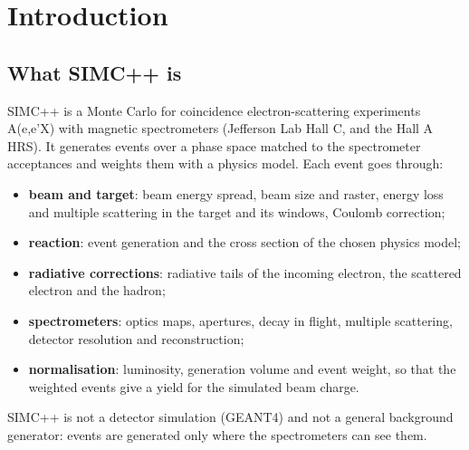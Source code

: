 \chapter{\texorpdfstring{Introduction}{Introduction}}\label{user_manual-01u5fintroduction}
\section{\texorpdfstring{What SIMC++ is}{What SIMC++ is}}\label{user_manual-01u5fintroduction:11-what-simc-is}
SIMC++ is a Monte Carlo for coincidence electron-scattering experiments A(e,e'X) with magnetic spectrometers (Jefferson Lab
Hall C, and the Hall A HRS). It generates events over a phase space matched to the spectrometer acceptances and weights
them with a physics model. Each event goes through:

\begin{itemize}
\item \textbf{beam and target}: beam energy spread, beam size and raster, energy loss and multiple scattering in the target and its
windows, Coulomb correction;
\item \textbf{reaction}: event generation and the cross section of the chosen physics model;
\item \textbf{radiative corrections}: radiative tails of the incoming electron, the scattered electron and the hadron;
\item \textbf{spectrometers}: optics maps, apertures, decay in flight, multiple scattering, detector resolution and reconstruction;
\item \textbf{normalisation}: luminosity, generation volume and event weight, so that the weighted events give a yield for the
simulated beam charge.
\end{itemize}
SIMC++ is not a detector simulation (GEANT4) and not a general background generator: events are generated only where the
spectrometers can see them.

